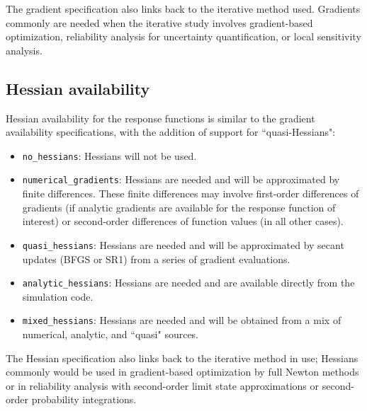 The gradient specification also links back to the iterative method
used. Gradients commonly are needed when the iterative
study involves gradient-based optimization, reliability analysis for
uncertainty quantification, or local sensitivity analysis.

\subsection{Hessian availability}\label{responses:overview:hessian}

Hessian availability for the response functions is similar to the
gradient availability specifications, with the addition of support
for ``quasi-Hessians":

\begin{itemize}

\item \texttt{no\_hessians}: Hessians will not be used.

\item \texttt{numerical\_gradients}: Hessians are needed and will be
  approximated by finite differences.  These finite differences may
  involve first-order differences of gradients (if analytic gradients
  are available for the response function of interest) or second-order 
  differences of function values (in all other cases).

\item \texttt{quasi\_hessians}: Hessians are needed and will be 
  approximated by secant updates (BFGS or SR1) from a series of 
  gradient evaluations.

\item \texttt{analytic\_hessians}: Hessians are needed and are
  available directly from the simulation code.

\item \texttt{mixed\_hessians}: Hessians are needed and will be 
  obtained from a mix of numerical, analytic, and ``quasi" sources.

\end{itemize}

The Hessian specification also links back to the iterative method in
use; Hessians commonly would be used in gradient-based
optimization by full Newton methods or in reliability analysis
with second-order limit state approximations or second-order
probability integrations.

